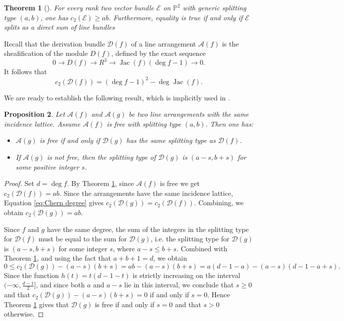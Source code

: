 \documentclass[12pt]{amsart}
\numberwithin{equation}{section}
\newtheorem{theorem}{Theorem}[section]
\newtheorem{proposition}[theorem]{Proposition}
\theoremstyle{definition}
\begin{document}
\begin{theorem}[{\cite[Theorem 1.45]{Y}}]
  \label{thm:splitt crit}
 For every rank two vector bundle ${\mathcal{E}}$ on ${ \ensuremath{\mathbb{P}}}^2$ with generic splitting type $(a, b)$,  one has $c_2 ({\mathcal{E}}) \ge ab$.  Furthermore, equality is true if and only if ${\mathcal{E}}$ splits as a direct sum of line bundles
\end{theorem} 

Recall that the derivation bundle ${\mathcal{D}} (f)$ of a line arrangement ${\mathcal{A}} (f)$ is the sheafification of the module $D(f)$, defined by the exact sequence 
\[
0 \to D(f) \to R^3 \to \operatorname{Jac} (f) (\deg f -1) \to 0. 
\]
It follows that 
\begin{equation}
   \label{eq:Chern degree} 
   c_2 ({\mathcal{D}} (f) ) = (\deg f - 1)^2 -  \deg \operatorname{Jac} (f). 
\end{equation}

We are ready to establish the following result, which is implicitly used in \cite{DIV}.  

\begin{proposition}
    \label{prop:split type free} 
Let ${\mathcal{A}} (f)$ and ${\mathcal{A}} (g)$ be two line arrangements with the same incidence lattice. Assume ${\mathcal{A}} (f)$ is free with splitting type $(a, b)$. Then one has: 
\begin{itemize}
\item[(a)] ${\mathcal{A}} (g)$ is free if and only if ${\mathcal{D}} (g)$ has the same splitting type as ${\mathcal{D}} (f)$.    

\item[(b)] If ${\mathcal{A}} (g)$ is not free, then the splitting type of ${\mathcal{D}} (g)$ is $(a - s, b+s)$ for some positive integer $s$. 
\end{itemize}
\end{proposition} 

\begin{proof}
Set $d = \deg f$. By Theorem \ref{thm:splitt crit}, since $\mathcal A(f)$ is free we get  $c_2 ({\mathcal{D}} (f)) = ab$.  Since the arrangements have the same incidence lattice, Equation \eqref{eq:Chern degree}  gives $c_2 ({\mathcal{D}} (g)) = c_2 ({\mathcal{D}} (f))$.  Combining, we obtain $c_2 ({\mathcal{D}} (g)) = ab$. 

Since $f$ and $g$ have the same degree, the sum of the integers in the splitting type for ${\mathcal{D}}(f)$ must be equal to the sum for ${\mathcal{D}}(g)$, i.e. the splitting type for ${\mathcal{D}}(g)$ is $(a-s,b+s)$ for some integer $s$, where $a-s \leq b+s$.
Combined with Theorem \ref{thm:splitt crit}, and using the fact that $a+b+1=d$, we obtain 
\[
0 \le c_2 ({\mathcal{D}} (g)) - (a-s) (b+s)  = a b - (a-s) (b+s) = a (d-1-a) - (a-s) (d-1-a+s). 
\]
Since the function $h (t) = t (d-1-t)$ is strictly increasing on the interval $(-\infty, \frac{d-1}{2}]$, and since both $a$ and $a-s$ lie in this interval, we conclude that  $s \ge 0$ and that $c_2 ({\mathcal{D}} (g)) - (a-s) (b+s)  = 0$ if and only if $s = 0$. Hence Theorem \ref{thm:splitt crit} gives that ${\mathcal{D}} (g)$ is free if and only if $s = 0$ and that $s > 0$ otherwise. 
\end{proof}
\end{document}
